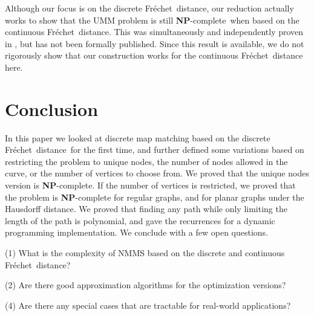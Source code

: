 \documentclass{article}[11pt]
\newcommand{\frechet}{Fr\'echet}
\newcommand{\dfd}{discrete \frechet\ distance}
\newcommand{\npc}{\textbf{NP}-complete}
\begin{document}
Although our focus is on the \dfd, our reduction actually works to show that the UMM problem is still
\npc\ when based on the continuous \frechet\ distance.  This was simultaneously and independently proven in
\cite{Meulemans:2013:CORR}, but has not been formally published. Since this result is available, we do not rigorously show that
our construction works for the continuous \frechet\ distance here.



















\section{Conclusion} \label{sec:conclusion}



In this paper we looked at discrete map matching based on the \dfd\ for the first time, and further defined
some variations based on restricting the problem to unique nodes, 
the number of nodes allowed in the curve, or the number of vertices to choose from.  
We proved that the unique nodes version is \textbf{NP}-complete.
If the number of vertices is restricted, we proved that the problem is \textbf{NP}-complete for regular graphs,
and for planar graphs under the Hausdorff distance.
We proved that finding any path while only limiting the length of the path is polynomial, and  
gave the recurrences for a dynamic programming implementation.
We conclude with a few open questions.

(1) What is the complexity of NMMS based on the discrete and continuous \frechet\ distance?

(2) Are there good approximation algorithms for the optimization versions?

(4) Are there any special cases that are tractable for real-world applications?



\nocite{Wylie:2013:PHD}



\end{document}
